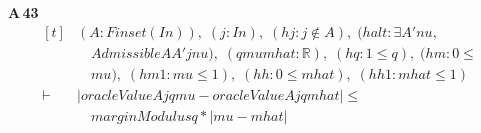 \noindent\textbf{A\,43}\quad{}
{\footnotesize\[ \begin{aligned}[t]
&(\mathit{A} : \mathit{Finset} (\mathit{I} \mathit{n})),\; (\mathit{j} : \mathit{I} \mathit{n}),\; (\mathit{hj} : \mathit{j} \notin \mathit{A}),\; (\mathit{halt} : \exists \mathit{A'} \mathit{nu},\\
&\quad \mathit{Admissible} \mathit{A} \mathit{A'} \mathit{j} \mathit{nu}),\; (\mathit{q} \mathit{mu} \mathit{mhat} : \mathbb{R} ),\; (\mathit{hq} : 1 \leq \mathit{q}),\; (\mathit{hm} : 0 \leq\\
&\quad \mathit{mu}),\; (\mathit{hm1} : \mathit{mu} \leq 1),\; (\mathit{hh} : 0 \leq \mathit{mhat}),\; (\mathit{hh1} : \mathit{mhat} \leq 1)\\
\vdash\;&|\mathit{oracleValue} \mathit{A} \mathit{j} \mathit{q} \mathit{mu}-\mathit{oracleValue} \mathit{A} \mathit{j} \mathit{q} \mathit{mhat}| \leq\\
&\quad \mathit{marginModulus} \mathit{q}*|\mathit{mu}-\mathit{mhat}|
\end{aligned} \]}

